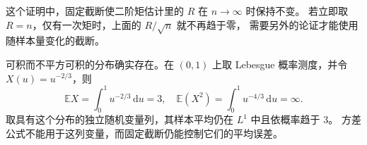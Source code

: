这个证明中，固定截断使二阶矩估计里的 \(R\) 在 \(n\to\infty\) 时保持不变。
若立即取 \(R=n\)，仅有一次矩时，上面的 \(R/\sqrt n\) 就不再趋于零，
需要另外的论证才能使用随样本量变化的截断。

\ProseParagraphBreak

可积而不平方可积的分布确实存在。在 \((0,1)\) 上取 Lebesgue 概率测度，并令
\(X(u)=u^{-2/3}\)，则
\[
 \mathbb E X=\int_0^1u^{-2/3}\,\mathrm du=3,
 \quad
 \mathbb E(X^2)=\int_0^1u^{-4/3}\,\mathrm du=\infty.
\]
取具有这个分布的独立随机变量列，其样本平均仍在 \(L^1\) 中且依概率趋于 \(3\)。
方差公式不能用于这列变量，而固定截断仍能控制它们的平均误差。
